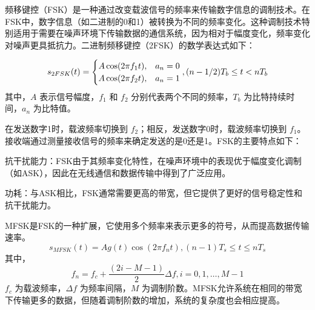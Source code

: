 

频移键控（FSK）是一种通过改变载波信号的频率来传输数字信息的调制技术。在FSK中，数字信息（如二进制的0和1）被转换为不同的频率变化。这种调制技术特别适用于需要在噪声环境下传输数据的通信系统，因为相对于幅度变化，频率变化对噪声更具抵抗力。二进制频移键控（2FSK）的数学表达式如下：

\begin{equation}
    s_{2FSK}(t) = \begin{cases}
        A \cos(2\pi f_1 t), & a_n = 0 \\
        A \cos(2\pi f_2 t), & a_n = 1
    \end{cases}, (n - 1/2)T_b \leq t < nT_b \\
\end{equation}
其中，\( A \) 表示信号幅度，\( f_1 \) 和 \( f_2 \) 分别代表两个不同的频率，\( T_b \) 为比特持续时间，\( a_n \) 为比特值。

在发送数字1时，载波频率切换到 \( f_2 \)；相反，发送数字0时，载波频率切换到 \( f_1 \)。接收端通过测量接收信号的频率来确定发送的是0还是1。FSK的主要特点如下：

抗干扰能力：FSK由于其频率变化特性，在噪声环境中的表现优于幅度变化调制（如ASK），因此在无线通信和数据传输中得到了广泛应用。

功耗：与ASK相比，FSK通常需要更高的带宽，但它提供了更好的信号稳定性和抗干扰能力。

MFSK是FSK的一种扩展，它使用多个频率来表示更多的符号，从而提高数据传输速率。
\begin{equation}
    s_{MFSK}(t) = Ag(t) \cos(2\pi f_n t), (n - 1) T_s \leq t \leq nT_s
\end{equation}
其中，
\begin{equation}
    f_n = f_c + \frac{(2i - M - 1)}{2} \Delta f, i = 0, 1, \dots, M - 1
\end{equation}
\( f_c \) 为载波频率，\( \Delta f \) 为频率间隔，\( M \) 为调制阶数。MFSK允许系统在相同的带宽下传输更多的数据，但随着调制阶数的增加，系统的复杂度也会相应提高。

